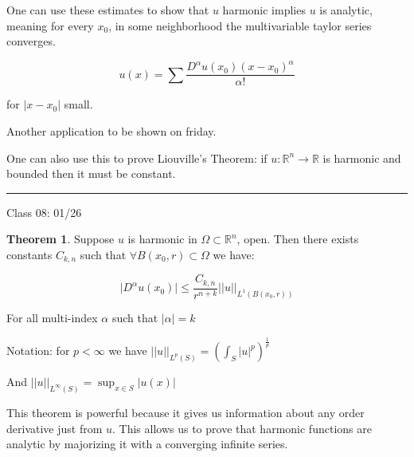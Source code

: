 \documentclass{article}
\theoremstyle{definition}
\newtheorem{theorem}{Theorem}
\begin{document}
One can use these estimates to show that \(u\) harmonic implies \(u\) is analytic, meaning for every \(x_0\), in some neighborhood the multivariable taylor series converges.

\[
    u(x) = \sum \frac{D^\alpha u(x_0)(x-x_0)^\alpha}{\alpha !}
\]

for \(\vert x - x_0 \vert \) small.

Another application to be shown on friday.

One can also use this to prove Liouville's Theorem: if \(u:\mathbb{R}^n \to \mathbb{R} \) is harmonic and bounded then it must be constant.

\hfil
\hrule

Class 08: 01/26

\begin{theorem}
    Suppose \(u\) is harmonic in \(\Omega \subset \mathbb{R} ^n\), open. Then there exists constants \(C_{k,n}\) such that \(\forall B(x_0,r) \subset \Omega \) we have:
    
    \[
        \vert D^\alpha u(x_0) \vert \leq \frac{C_{k,n}}{r^{n+k}} \vert \vert u \vert  \vert _{L^1(B(x_0,r))}
    \]

    For all multi-index \(\alpha \) such that \(\vert \alpha  \vert = k\)

    Notation: for \(p<\infty \) we have \(\vert \vert u \vert  \vert _{L^p(S)} = (\int _S \vert u \vert ^p)^\frac{1}{p}\)
    
    And \(\vert \vert u \vert  \vert _{L^{\infty} (S)} = \sup _{x\in S}\vert u(x) \vert \) 

\end{theorem}

This theorem is powerful because it gives us information about any order derivative just from \(u\). This allows us to prove that harmonic functions are analytic by majorizing it with a converging infinite series.
\end{document}
